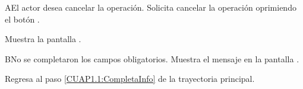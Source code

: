 \begin{UCtrayectoriaA}{A}{El actor desea cancelar la operación.}
	\UCpaso [\UCactor] Solicita cancelar la operación oprimiendo el botón .
	
	\UCpaso [\UCsist] Muestra la pantalla . 
\end{UCtrayectoriaA}

\begin{UCtrayectoriaA}{B}{No se completaron los campos obligatorios.}
	\UCpaso [\UCsist] Muestra el mensaje  en la pantalla .
	
	\UCpaso Regresa al paso \ref{CUAP1.1:CompletaInfo} de la trayectoria principal.
\end{UCtrayectoriaA}

